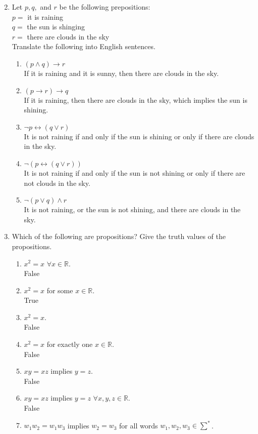 \documentclass{article}
\newcommand{\R}{\mathbb{R}}
\begin{document}
\begin{enumerate}
\setcounter{enumi}{1}
\item Let $p, q,$ and $r$ be the following prepositions:\\
	$p=$ it is raining\\
	$q=$ the sun is shinging\\
	$r=$ there are clouds in the sky\\
	Translate the following into English sentences.
	\begin{enumerate}
	\item $(p\wedge q)\to r$\\
	If it is raining and it is sunny, then there are clouds in the sky.
	\item $(p\to r)\to q$\\
	If it is raining, then there are clouds in the sky, which implies the sun is shining.
	\item $\neg p\leftrightarrow (q\vee r)$\\
	It is not raining if and only if the sun is shining or only if there are
	clouds in the sky.
	\item $\neg (p\leftrightarrow (q\vee r))$\\
	It is not raining if and only if the sun is not shining or only if there are not clouds in the sky.
	\item $\neg (p\vee q)\wedge r$\\
	It is not raining, or the sun is not shining, and there are clouds in the sky.
	\end{enumerate}
\setcounter{enumi}{3}
\item Which of the following are propositions? Give the truth values of the propositions.
	\begin{enumerate}
	\item $x^2=x$ $\forall x\in\R$.\\
	False
	\item $x^2=x$ for some $x\in\R$.\\
	True
	\item $x^2=x$.\\
	False
	\item $x^2=x$ for exactly one $x\in\R$.\\
	False
	\item $xy=xz$ implies $y=z$.\\
	False
	\item $xy=xz$ implies $y=z$ $\forall x,y,z\in\R$.\\
	False
	\item $w_1w_2=w_1w_3$ implies $w_2=w_3$ for all words $w_1,w_2,w_3\in\sum^\ast$.\\

\end{enumerate}
\end{enumerate}
\end{document}
